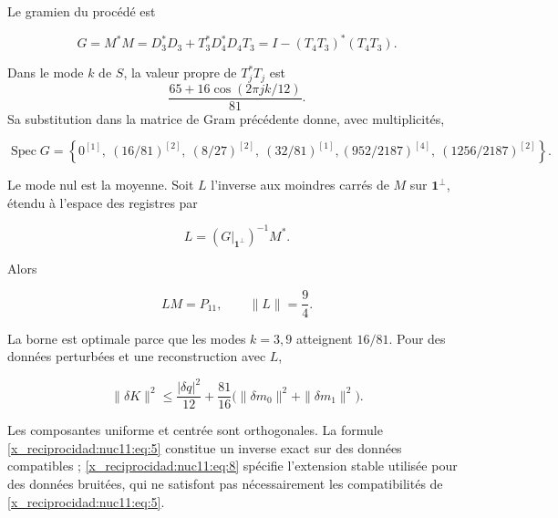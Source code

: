 Le gramien du procédé est



\begin{equation}
G=M^*M=D_3^*D_3+T_3^*D_4^*D_4T_3
=I-(T_4T_3)^*(T_4T_3).
\label{x_reciprocidad:nuc11:eq:6}
\end{equation}



Dans le mode \(k\) de \(S\), la valeur propre de \(T_j^*T_j\) est
\[
 \frac{65+16\cos(2\pi jk/12)}{81}.
\]
Sa substitution dans la matrice de Gram précédente donne, avec multiplicités,



\begin{equation}
\operatorname{Spec}G=\left\{
0^{[1]},\ (16/81)^{[2]},\ (8/27)^{[2]},\ (32/81)^{[1]},
(952/2187)^{[4]},\ (1256/2187)^{[2]}\right\}.
\label{x_reciprocidad:nuc11:eq:7}
\end{equation}



Le mode nul est la moyenne. Soit \(L\) l’inverse aux moindres carrés
de \(M\) sur \(\mathbf1^\perp\), étendu à l’espace des
registres par



\[
L=(G|_{\mathbf1^\perp})^{-1}M^*.
\]



Alors



\begin{equation}
LM=P_{11},\qquad \|L\|=\frac94.
\label{x_reciprocidad:nuc11:eq:8}
\end{equation}



La borne est optimale parce que les modes \(k=3,9\) atteignent \(16/81\).
Pour des données perturbées et une reconstruction avec \(L\),



\begin{equation}
\|\delta K\|^2\le \frac{|\delta q|^2}{12}
+\frac{81}{16}\bigl(\|\delta m_0\|^2+\|\delta m_1\|^2\bigr).
\label{x_reciprocidad:nuc11:eq:9}
\end{equation}



Les composantes uniforme et centrée sont orthogonales. La formule \eqref{x_reciprocidad:nuc11:eq:5} constitue un inverse exact sur des données compatibles ; \eqref{x_reciprocidad:nuc11:eq:8} spécifie l’extension stable utilisée pour des données bruitées, qui ne satisfont pas nécessairement les compatibilités de \eqref{x_reciprocidad:nuc11:eq:5}.

